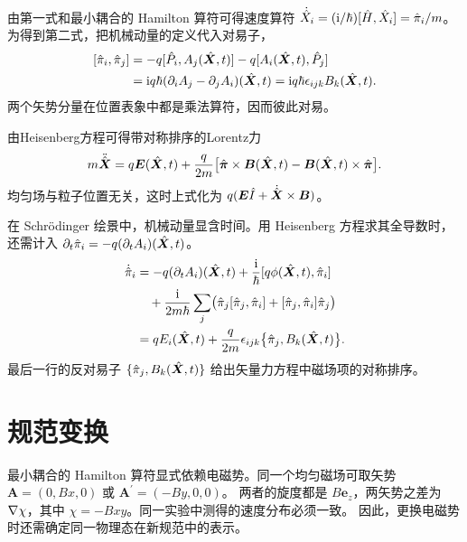 由第一式和最小耦合的 Hamilton 算符可得速度算符 $\dot{\hat{X}}_i = (\mathrm{i}/\hbar)[\hat{H},\hat{X}_i] = \hat{\pi}_i/m$。为得到第二式，把机械动量的定义代入对易子，
\[
    \begin{alignedat}{1}
        \relax[\hat{\pi}_i,\hat{\pi}_j] &= -q[\hat{P}_i,A_j(\hat{\bm{X}},t)] - q[A_i(\hat{\bm{X}},t),\hat{P}_j]\\
        &= \mathrm{i} q\hbar(\partial_i A_j - \partial_j A_i)(\hat{\bm{X}},t)
            = \mathrm{i} q\hbar\epsilon_{ijk} B_k(\hat{\bm{X}},t).
    \end{alignedat}
\]
两个矢势分量在位置表象中都是乘法算符，因而彼此对易。

由Heisenberg方程可得带对称排序的Lorentz力
\begin{equation}
    m\ddot{\hat{\bm{X}}} = q\bm E(\hat{\bm{X}},t) + \frac q{2m}
    \bigl[\hat{\bm{\pi}} \times \bm B(\hat{\bm{X}},t) - \bm B(\hat{\bm{X}},t) \times \hat{\bm{\pi}}\bigr].
\end{equation}
均匀场与粒子位置无关，这时上式化为 $q(\bm E\hat{I} + \dot{\hat{\bm{X}}} \times \bm B)$。

在 Schrödinger 绘景中，机械动量显含时间。用 Heisenberg 方程求其全导数时，还需计入 $\partial_t\hat{\pi}_i = -q(\partial_t A_i)(\hat{\bm{X}},t)$。
\begin{equation}
    \begin{alignedat}{1}
        \dot{\hat{\pi}}_i &= -q(\partial_t A_i)(\hat{\bm{X}},t) + \frac{\mathrm{i}}{\hbar}[q\phi(\hat{\bm{X}},t),\hat{\pi}_i]\\
            &\quad +\frac{\mathrm{i}}{2m\hbar}
            \sum_j\bigl(\hat{\pi}_j[\hat{\pi}_j,\hat{\pi}_i] + [\hat{\pi}_j,\hat{\pi}_i]\hat{\pi}_j\bigr)\\
        &= q E_i(\hat{\bm{X}},t) + \frac{q}{2m}
            \epsilon_{ijk}\bigl\{\hat{\pi}_j,B_k(\hat{\bm{X}},t)\bigr\}.
    \end{alignedat}
\end{equation}
最后一行的反对易子 $\{\hat{\pi}_j,B_k(\hat{\bm{X}},t)\}$ 给出矢量力方程中磁场项的对称排序。

\section{规范变换}
最小耦合的 Hamilton 算符显式依赖电磁势。同一个均匀磁场可取矢势 $\bm A = (0,Bx,0)$ 或 $\bm A^\prime = (-By,0,0)$。
两者的旋度都是 $B\bm e_z$，两矢势之差为 $\nabla\chi$，其中 $\chi = -Bxy$。同一实验中测得的速度分布必须一致。
因此，更换电磁势时还需确定同一物理态在新规范中的表示。

